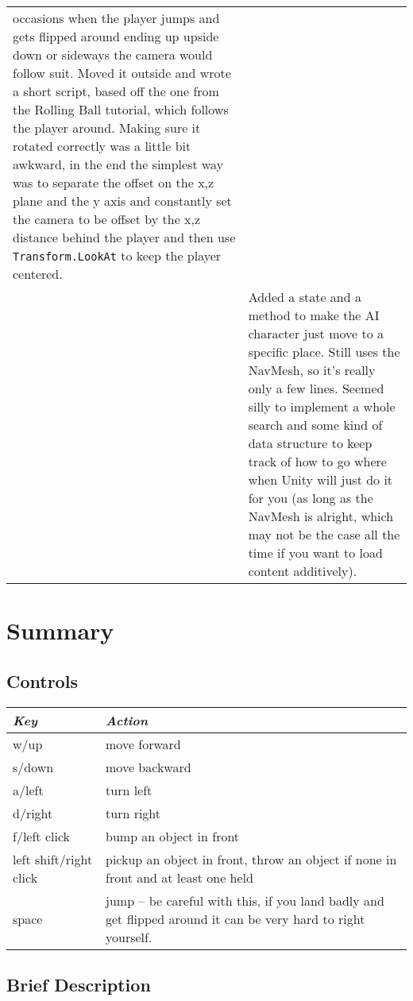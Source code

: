 \documentclass[11pt]{article}
\begin{document}
\begin{longtabu}{X[r] | X[3,l]}
		  occasions when the player jumps and gets flipped around ending up upside down or sideways 
		  the camera would follow suit. Moved it outside and wrote a short script, based off the one from 
		  the Rolling Ball tutorial, which follows the player around. Making sure it rotated correctly was
		  a little bit awkward, in the end the simplest way was to separate the offset on the x,z plane
		  and the y axis and constantly set the camera to be offset by the x,z distance behind the player
		  and then use \texttt{Transform.LookAt} to keep the player centered.\\
		& Added a state and a method to make the AI character just move to a specific place. Still uses
		  the NavMesh, so it's really only a few lines. Seemed silly to implement a whole search and some 
		  kind of data structure to keep track of how to go where when Unity will just do it for you
		  (as long as the NavMesh is alright, which may not be the case all the time if you want to load
		  content additively).\\
	\hline
\end{longtabu}

\section{Summary}
\subsection{Controls}
\begin{tabu}{X[r] | X[l,2.5]}
\textit{Key} & \textit{Action} \\
\hline
w/up & move forward \\
s/down & move backward \\
a/left & turn left \\
d/right & turn right\\
f/left click & bump an object in front \\
left shift/right click & pickup an object in front, throw an object if none in front and at least one 
held\\
space & jump -- be careful with this, if you land badly and get flipped around it can be very hard to 
right yourself.\\
\end{tabu}

\subsection{Brief Description}
\end{document}
